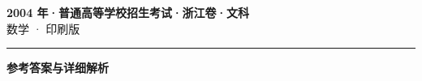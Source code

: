 \documentclass[zihao=5, a4paper]{ctexart}
\begin{document}
\begin{center}
  {\Large\bfseries 2004 年·普通高等学校招生考试·浙江卷·文科}\\[4pt]
  {\large 数学 · 印刷版}
\end{center}
\medskip
{}

\par\bigskip\hrule\bigskip
{}
\begin{center}{\large\bfseries 参考答案与详细解析}\end{center}
\smallskip

\end{document}
